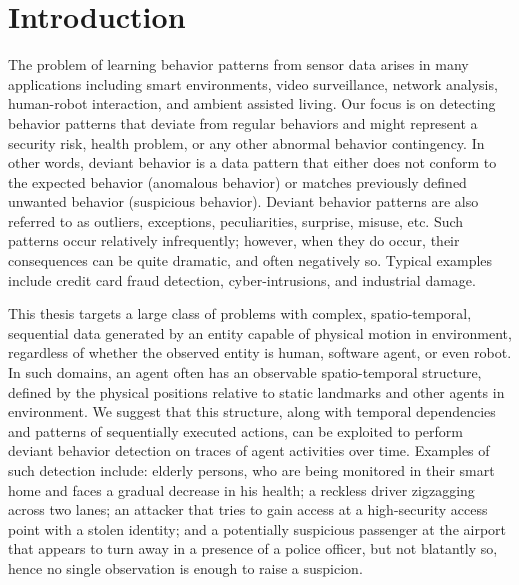
\chapter{Introduction}
\label{chap:introduction}

The problem of learning behavior patterns from sensor data arises in many applications including smart environments, video surveillance, network analysis, human-robot interaction, and ambient assisted living. Our focus is on detecting behavior patterns that deviate from regular behaviors and might represent a security risk, health problem, or any other abnormal behavior contingency. In other words, deviant behavior is a data pattern that either does not conform to the expected behavior (anomalous behavior) or matches previously defined unwanted behavior (suspicious behavior). Deviant behavior patterns are also referred to as outliers, exceptions, peculiarities, surprise, misuse, etc. Such patterns occur relatively infrequently; however, when they do occur, their consequences can be quite dramatic, and often negatively so. Typical examples include credit card fraud detection, cyber-intrusions, and industrial damage.

This thesis targets a large class of problems with complex, spatio-temporal, sequential data generated by an entity capable of physical motion in environment, regardless of whether the observed entity is human, software agent, or even robot. In such domains, an agent often has an observable spatio-temporal structure, defined by the physical positions relative to static landmarks and other agents in environment. We suggest that this structure, along with temporal dependencies and patterns of sequentially executed actions, can be exploited to perform deviant behavior detection on traces of agent activities over time. Examples of such detection include: elderly persons, who are being monitored in their smart home and faces a gradual decrease in his health; a reckless driver zigzagging across two lanes; an attacker that tries to gain access at a high-security access point with a stolen identity; and a potentially suspicious passenger at the airport that appears to turn away in a presence of a police officer, but not blatantly so, hence no single observation is enough to raise a suspicion.





